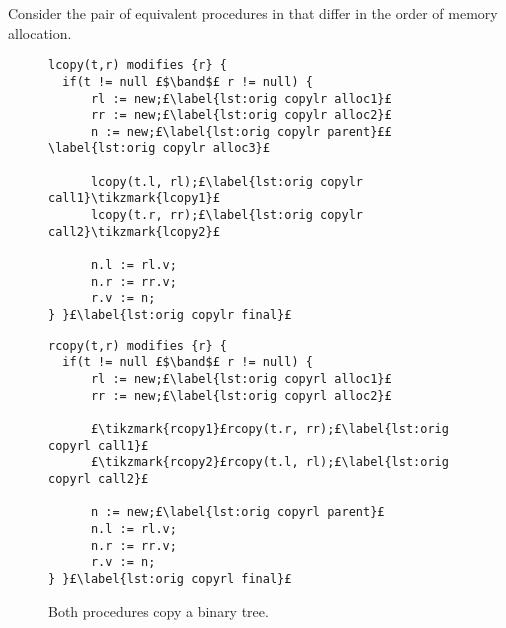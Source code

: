\documentclass[runningheads,a4paper]{llncs}
\newcommand{\tikzmark}[1]{\tikz[overlay,remember picture] \node (#1) {};}
\DeclareMathOperator{\band}{\bm{\;\land\;}}
\begin{document}
Consider the pair of equivalent procedures in  that differ in the order of memory allocation.

\begin{figure}[htbp]%
\centering%
\noindent\begin{minipage}{.45\textwidth}%
\begin{lstlisting}[style=bl,label=lst:copylr,name=copyex]
lcopy(t,r) modifies {r} {
  if(t != null £$\band$£ r != null) {
      rl := new;£\label{lst:orig copylr alloc1}£
      rr := new;£\label{lst:orig copylr alloc2}£
      n := new;£\label{lst:orig copylr parent}££\label{lst:orig copylr alloc3}£

      lcopy(t.l, rl);£\label{lst:orig copylr call1}\tikzmark{lcopy1}£
      lcopy(t.r, rr);£\label{lst:orig copylr call2}\tikzmark{lcopy2}£

      n.l := rl.v;
      n.r := rr.v;
      r.v := n;
} }£\label{lst:orig copylr final}£
\end{lstlisting}%
\end{minipage}%
\begin{minipage}{.45\textwidth}%
\begin{lstlisting}[style=bl,label=lst:copyrl,firstnumber=auto,name=copyex]
rcopy(t,r) modifies {r} {
  if(t != null £$\band$£ r != null) {
      rl := new;£\label{lst:orig copyrl alloc1}£
      rr := new;£\label{lst:orig copyrl alloc2}£

      £\tikzmark{rcopy1}£rcopy(t.r, rr);£\label{lst:orig copyrl call1}£
      £\tikzmark{rcopy2}£rcopy(t.l, rl);£\label{lst:orig copyrl call2}£

      n := new;£\label{lst:orig copyrl parent}£
      n.l := rl.v;
      n.r := rr.v;
      r.v := n;
} }£\label{lst:orig copyrl final}£
\end{lstlisting}%
\end{minipage}%
\caption[Two procedures, \copylr{} and \copyrl{}, that copy a binary tree]{Both procedures copy a binary tree.
\label{fig:copy tree}}%
%
\end{figure}
\end{document}
